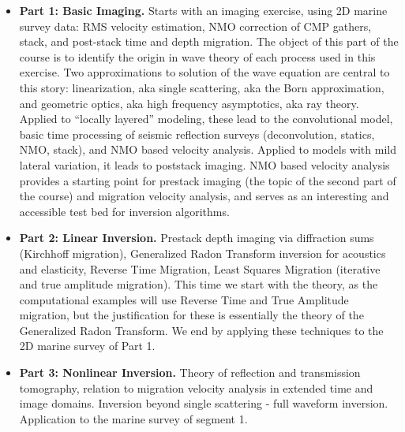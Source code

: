 \begin{itemize}
\item {\bf Part 1: Basic Imaging.} Starts with an imaging exercise, using 2D marine survey data: RMS velocity estimation, NMO correction of CMP gathers, stack, and post-stack time and depth migration. The object of this part of the course is to identify the origin in wave theory of each process used in this exercise. Two approximations to solution of the wave equation are central to this story: linearization, aka single scattering, aka the Born approximation, and geometric optics, aka high frequency asymptotics, aka ray theory. Applied to ``locally layered'' modeling, these lead to the convolutional model, basic time processing of seismic reflection surveys (deconvolution, statics, NMO, stack), and NMO based velocity analysis. Applied to models with mild lateral variation, it leads to poststack imaging. NMO based velocity analysis provides a starting point for prestack imaging (the topic of the second part of the course) and migration velocity analysis, and serves as an interesting and accessible test bed for inversion algorithms.  

\item {\bf Part 2: Linear Inversion.} Prestack depth imaging via diffraction sums (Kirchhoff migration), Generalized Radon Transform inversion for acoustics and elasticity, Reverse Time Migration, Least Squares Migration (iterative and true amplitude migration). This time we start with the theory, as the computational examples will use Reverse Time and True Amplitude migration, but the justification for these is essentially the theory of the Generalized Radon Transform. We end by applying these techniques to the 2D marine survey of Part 1.

\item {\bf Part 3: Nonlinear Inversion.} Theory of reflection and transmission tomography, relation to migration velocity analysis in extended time and image domains. Inversion beyond single scattering - full waveform inversion.  Application to the marine survey of segment 1. 

\end{itemize}

